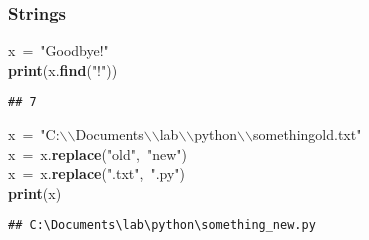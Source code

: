 \documentclass{beamer}\usepackage[]{graphicx}\usepackage[]{color}
\makeatletter
\newcommand{\hlstr}[1]{\textcolor[rgb]{0.192,0.494,0.8}{#1}}%
\newcommand{\hlcom}[1]{\textcolor[rgb]{0.678,0.584,0.686}{\textit{#1}}}%
\newcommand{\hlopt}[1]{\textcolor[rgb]{0,0,0}{#1}}%
\newcommand{\hlstd}[1]{\textcolor[rgb]{0.345,0.345,0.345}{#1}}%
\newcommand{\hlkwa}[1]{\textcolor[rgb]{0.161,0.373,0.58}{\textbf{#1}}}%
\newcommand{\hlkwd}[1]{\textcolor[rgb]{0.737,0.353,0.396}{\textbf{#1}}}%
\newenvironment{kframe}{%
 \def\at@end@of@kframe{}%
 \ifinner\ifhmode%
  \def\at@end@of@kframe{\end{minipage}}%
  \begin{minipage}{\columnwidth}%
 \fi\fi%
 \def\FrameCommand##1{\hskip\@totalleftmargin \hskip-\fboxsep
 \colorbox{shadecolor}{##1}\hskip-\fboxsep
     \hskip-\linewidth \hskip-\@totalleftmargin \hskip\columnwidth}%
 \MakeFramed {\advance\hsize-\width
   \@totalleftmargin\z@ \linewidth\hsize
   \@setminipage}}%
 {\par\unskip\endMakeFramed%
 \at@end@of@kframe}
\newenvironment{knitrout}{}{} %
\let\hlesc\hlstd \let\hlpps\hlstd \let\hllin\hlstd \let\hlslc\hlcom \let\hlppc\hlcom
\makeatother
\begin{document}
\begin{frame}[fragile]
\frametitle{Strings}
\begin{knitrout}
\color{fgcolor}\begin{kframe}
\noindent
\ttfamily
\hlstd{x\ }\hlopt{=\ }\hlstd{}\hlstr{"Goodbye!"}\hlstd{}\hspace*{\fill}\\
\hlkwa{print}\hlstd{}\hlopt{(}\hlstd{x}\hlopt{.}\hlstd{}\hlkwd{find}\hlstd{}\hlopt{(}\hlstd{}\hlstr{"!"}\hlstd{}\hlopt{))}\hlstd{}\hspace*{\fill}
\mbox{}
\normalfont

\begin{verbatim}
## 7
\end{verbatim}
\end{kframe}
\end{knitrout}

\begin{knitrout}
\color{fgcolor}\begin{kframe}
\noindent
\ttfamily
\hlstd{x\ }\hlopt{=\ }\hlstd{}\hlstr{"C:}\hlesc{$\backslash$$\backslash$}\hlstr{Documents}\hlesc{$\backslash$$\backslash$}\hlstr{lab}\hlesc{$\backslash$$\backslash$}\hlstr{python}\hlesc{$\backslash$$\backslash$}\hlstr{something\textunderscore old.txt"}\hlstd{\hspace*{\fill}\\
x\ }\hlopt{=\ }\hlstd{x}\hlopt{.}\hlstd{}\hlkwd{replace}\hlstd{}\hlopt{(}\hlstd{}\hlstr{"old"}\hlstd{}\hlopt{,\ }\hlstd{}\hlstr{"new"}\hlstd{}\hlopt{)}\hspace*{\fill}\\
\hlstd{x\ }\hlopt{=\ }\hlstd{x}\hlopt{.}\hlstd{}\hlkwd{replace}\hlstd{}\hlopt{(}\hlstd{}\hlstr{".txt"}\hlstd{}\hlopt{,\ }\hlstd{}\hlstr{".py"}\hlstd{}\hlopt{)}\hspace*{\fill}\\
\hlstd{}\hlkwa{print}\hlstd{}\hlopt{(}\hlstd{x}\hlopt{)}\hlstd{}\hspace*{\fill}
\mbox{}
\normalfont

\begin{verbatim}
## C:\Documents\lab\python\something_new.py
\end{verbatim}
\end{kframe}
\end{knitrout}
\end{frame}
\end{document}
